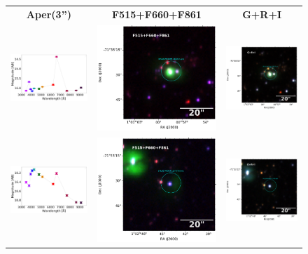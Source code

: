 \documentclass[11pt]{article}
\begin{document}
\newpage
\begin{figure}[!h]
\centering
\begin{tabular}{ccc}
\textbf{Aper(3'')} & \textbf{F515+F660+F861} & \textbf{G+R+I} \\
\includegraphics[width=0.3\linewidth, clip]{photopectrum_splus_MC0094-318227_compat-HIIRegions-smc-match-splus_aper.pdf} & \includegraphics[width=0.3\linewidth, clip]{MC0094/MC0094_F861_318227-RGB.pdf} & \includegraphics[width=0.3\linewidth, clip]{MC0094/MC0094_I_318227-RGB.pdf} \\
\includegraphics[width=0.3\linewidth, clip]{photopectrum_splus_MC0095-257970_compat-HIIRegions-smc-match-splus_aper.pdf} & \includegraphics[width=0.3\linewidth, clip]{MC0095/MC0095_F861_257970-RGB.pdf} & \includegraphics[width=0.3\linewidth, clip]{MC0095/MC0095_I_257970-RGB.pdf} \\

\end{tabular}
\end{figure}
\end{document}
